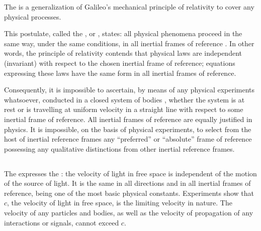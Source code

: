 The  is a generalization of Galileo's mechanical principle of relativity  to cover any physical processes.

This postulate, called the , or , states: all physical phenomena proceed in the same way, under the same conditions, in all inertial frames of reference . In other words, the principle of relativity contends that physical laws are independent (invariant) with respect to the chosen inertial frame of reference; equations expressing these laws have the same form in all inertial frames of reference. 

Consequently, it is impossible to ascertain, by means of any physical experiments whatsoever, conducted in a closed system of bodies , whether the system is at rest or is travelling at uniform velocity in a straight line with respect to some inertial frame of reference. All inertial frames of reference are equally justified in physics. It is impossible, on the basis of physical experiments, to select from the host of inertial reference frames any ``preferred'' or ``absolute'' frame of reference possessing any qualitative distinctions from other inertial reference frames.

\subsection{}\label{5.1.3} The  expresses the : the velocity of light in free space is independent of the motion of the source of light. It is the same in all directions and in all inertial frames of reference, being one of the most basic physical constants. Experiments show that $c$, the velocity of light in free space, is the limiting velocity in nature. The velocity of any particles and bodies, as well as the velocity of propagation of any interactions or signals, cannot exceed $c$.

